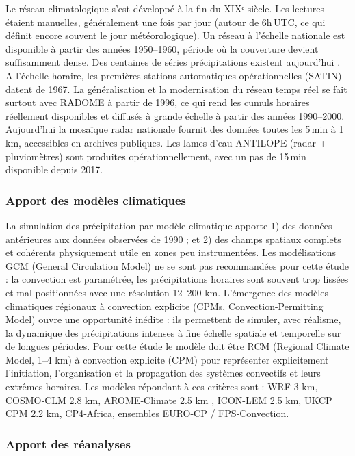 \documentclass[
  article,
  nofooter,
  noheadings]{jss}
\begin{document}
Le réseau climatologique s'est développé à la fin du XIXᵉ siècle. Les
lectures étaient manuelles, généralement une fois par jour (autour de
6h\,UTC, ce qui définit encore souvent le jour météorologique). Un
réseau à l'échelle nationale est disponible à partir des années
1950--1960, période où la couverture devient suffisamment dense. Des
centaines de séries précipitations existent aujourd'hui
\citep{meteo-france_2020_breve_observation_classique}. A l'échelle
horaire, les premières stations automatiques opérationnelles (SATIN)
datent de 1967. La généralisation et la modernisation du réseau temps
réel se fait surtout avec RADOME à partir de 1996, ce qui rend les
cumuls horaires réellement disponibles et diffusés à grande échelle à
partir des années 1990--2000. Aujourd'hui la mosaïque radar nationale
fournit des données toutes les 5\,min à 1\,km, accessibles en archives
publiques. Les lames d'eau ANTILOPE (radar + pluviomètres) sont
produites opérationnellement, avec un pas de 15\,min disponible depuis
2017.

\subsubsection{Apport des modèles
climatiques}\label{apport-des-moduxe8les-climatiques}

La simulation des précipitation par modèle climatique apporte 1) des
données antérieures aux données observées de 1990 ; et 2) des champs
spatiaux complets et cohérents physiquement utile en zones peu
instrumentées. Les modélisations GCM (General Circulation Model) ne se
sont pas recommandées pour cette étude : la convection est paramétrée,
les précipitations horaires sont souvent trop lissées et mal
positionnées avec une résolution 12--200 km. L'émergence des modèles
climatiques régionaux à convection explicite (CPMs,
Convection-Permitting Model) ouvre une opportunité inédite : ils
permettent de simuler, avec réalisme, la dynamique des précipitations
intenses à fine échelle spatiale et temporelle sur de longues périodes.
Pour cette étude le modèle doit être RCM (Regional Climate Model, 1--4
km) à convection explicite (CPM) pour représenter explicitement
l'initiation, l'organisation et la propagation des systèmes convectifs
et leurs extrêmes horaires. Les modèles répondant à ces critères sont :
WRF 3 km, COSMO‑CLM 2.8 km, AROME‑Climate 2.5 km \citep{cnrm_arome2007},
ICON-LEM 2.5 km, UKCP CPM 2.2 km, CP4‑Africa, ensembles EURO-CP /
FPS‑Convection.

\subsubsection{Apport des réanalyses}\label{apport-des-ruxe9analyses}
\end{document}
